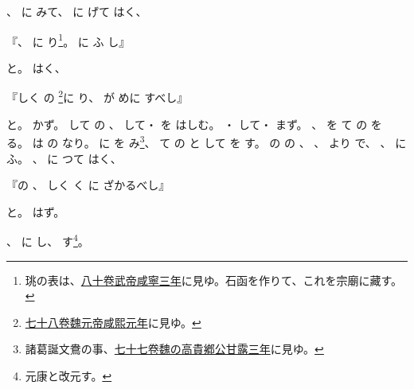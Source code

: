 \documentclass[a4paper,12pt]{article}
\begin{document}
%
、%
に%
みて、%
%
に%
げて%
はく、%
\begin{quoting}
『、%
に%
り\footnote{珧の表は、\href{http://dl.ndl.go.jp/info:ndljp/pid/1239900/129}{八十卷武帝咸寧三年}に見ゆ。石函を作りて、これを宗廟に藏す。}。%
に%
ふ%
し』
\end{quoting}
と。%
%
はく、%
\begin{quoting}
『しく%
の%
\footnote{\href{http://dl.ndl.go.jp/info:ndljp/pid/1239900/95}{七十八卷魏元帝咸熙元年}に見ゆ。}に%
り、%
が%
めに%
すべし』
\end{quoting}
と。%
%
かず。%
して%
の%
、%
して・%
を%
はしむ。%
・%
して・%
まず。%
、%
を%
て%
の%
を%
る。%
は%
の%
なり。%
に%
を%
み\footnote{諸葛誕文鴦の事、\href{http://dl.ndl.go.jp/info:ndljp/pid/1239900/72}{七十七卷魏の高貴鄕公甘露三年}に見ゆ。}、%
て%
の%
と%
して%
を%
す。%
の%
の%
、%
、%
より%
で、%
、%
に%
ふ。%
、%
に%
つて%
はく、%
\begin{quoting}
『の%
、%
しく%
く%
に%
ざかるべし』
\end{quoting}
と。%
%
はず。%

%
、%
に%
し、%
す\footnote{元康と改元す。}。%
\end{document}
